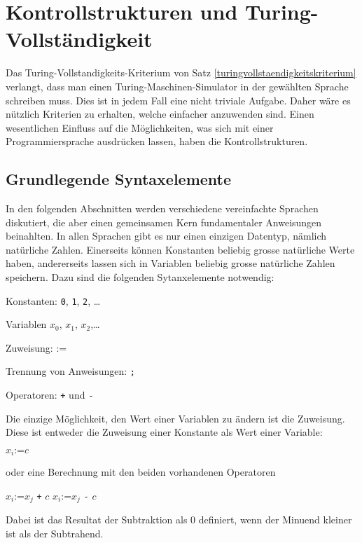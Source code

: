 %
%
%
\section{Kontrollstrukturen und Turing-Vollständigkeit}
Das Turing-Vollstandigkeits-Kriterium von Satz
\ref{turingvollstaendigkeitskriterium} verlangt, dass man einen
Turing-Maschinen-Simulator in der gewählten Sprache schreiben muss.
Dies ist in jedem Fall eine nicht triviale Aufgabe.
Daher wäre es nützlich Kriterien zu erhalten, welche einfacher
anzuwenden sind.
Einen wesentlichen Einfluss auf die Möglichkeiten,
was sich mit einer Programmiersprache ausdrücken lassen, haben die
Kontrollstrukturen.

\newcommand{\assignment}{\mathbin{\texttt{:=}}}

\subsection{Grundlegende Syntaxelemente%
\label{subsection:grundlegende-syntaxelement}}
In den folgenden Abschnitten werden verschiedene vereinfachte Sprachen
diskutiert, die aber einen gemeinsamen Kern fundamentaler Anweisungen
beinahlten.
In allen Sprachen gibt es nur einen einzigen Datentyp, nämlich
natürliche Zahlen.
Einerseits können Konstanten beliebig grosse natürliche Werte haben,
andererseits lassen sich in Variablen beliebig grosse natürliche Zahlen
speichern.
Dazu sind die folgenden Sytanxelemente notwendig:
\begin{compactitem}
\item Konstanten: {\tt 0}, {\tt 1}, {\tt 2}, \dots
\item Variablen $x_0$, $x_1$, $x_2$,\dots
\item Zuweisung: $\assignment$
\item Trennung von Anweisungen: {\tt ;}
\item Operatoren: {\tt +} und {\tt -}
\end{compactitem}
Die einzige Möglichkeit, den Wert einer Variablen zu ändern ist die
Zuweisung.
Diese ist entweder die Zuweisung einer Konstante als
Wert einer Variable:
\begin{algorithmic}
\STATE $x_i\assignment c$
\end{algorithmic}
oder eine Berechnung mit den beiden vorhandenen Operatoren
\begin{algorithmic}
\STATE $x_i \assignment x_j$ {\tt +} $c$
\STATE $x_i \assignment x_j$ {\tt -} $c$
\end{algorithmic}
Dabei ist das Resultat der Subtraktion als $0$ definiert, wenn
der Minuend kleiner ist als der Subtrahend.

